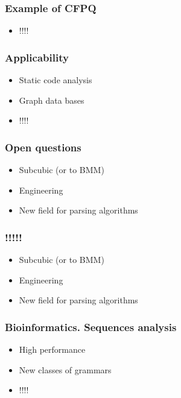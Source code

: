 \documentclass[xcolor=table]{beamer}
\begin{document}
\begin{frame} \frametitle{Example of CFPQ}
\begin{itemize}
\item !!!!
\end{itemize}
\end{frame}


\begin{frame} \frametitle{Applicability}
\begin{itemize}
\item Static code analysis
\item Graph data bases
\item !!!!
\end{itemize}
\end{frame}


\begin{frame} \frametitle{Open questions}
\begin{itemize}
\item Subcubic (or to BMM)
\item Engineering
\item New field for parsing algorithms
\end{itemize}
\end{frame}


\begin{frame} \frametitle{!!!!!}
\begin{itemize}
\item Subcubic (or to BMM)
\item Engineering
\item New field for parsing algorithms
\end{itemize}
\end{frame}


\begin{frame} \frametitle{Bioinformatics. Sequences analysis}
\begin{itemize}
\item High performance
\item New classes of grammars
\item !!!!
\end{itemize}
\end{frame}
\end{document}
